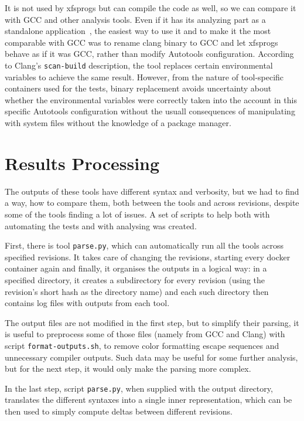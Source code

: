 It is not used by xfsprogs but can compile the code as well, so we can compare
it with GCC and other analysis tools. Even if it has its analyzing part as a
standalone application~\cite{ClangAnalyser}, the easiest way to use it and to
make it the most comparable with GCC was to rename clang binary to GCC and let
xfsprogs behave as if it was GCC, rather than modify Autotools configuration.
According to Clang's {\tt scan-build} description, the tool replaces certain
environmental variables to achieve the same result. However, from the nature of
tool-specific containers used for the tests, binary replacement avoids
uncertainty about whether the environmental variables were correctly taken into
the account in this specific Autotools configuration without the usuall
consequences of manipulating with system files without the knowledge of a
package manager.

\section{Results Processing}\label{chap:techniques:processing}
The outputs of these tools have different syntax and verbosity, but we had to
find a way, how to compare them, both between the tools and across revisions,
     despite some of the tools finding a lot of issues. A set of
     scripts to help both with automating the tests and with analysing was
     created.

First, there is tool {\tt parse.py}, which can automatically run all the tools
across specified revisions. It takes care of changing the revisions, starting
every docker container again and finally, it organises the outputs in a logical
way: in a specified directory, it creates a subdirectory for every revision
(using the revision's short hash as the directory name) and each such directory
then contains log files with outputs from each tool.

The output files are not modified in the first step, but to simplify their
parsing, it is useful to preprocess some of those files (namely from GCC and
							 Clang) with script
{\tt format-outputs.sh}, to remove color formatting escape sequences and
unnecessary compiler outputs.  Such data may be useful for some further
analysis, but for the next step, it would only make the parsing more complex.

In the last step, script {\tt parse.py}, when supplied with the output
directory, translates the different syntaxes into a single inner
representation, which can be then used to simply compute deltas between
different revisions.

